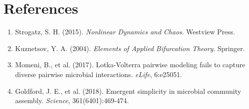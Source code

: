 \documentclass[11pt]{article}
\begin{document}
\section*{References}

\small
\begin{enumerate}
    \item Strogatz, S. H. (2015). \textit{Nonlinear Dynamics and Chaos}. Westview Press.
    \item Kuznetsov, Y. A. (2004). \textit{Elements of Applied Bifurcation Theory}. Springer.
    \item Momeni, B., et al. (2017). Lotka-Volterra pairwise modeling fails to capture diverse pairwise microbial interactions. \textit{eLife}, 6:e25051.
    \item Goldford, J. E., et al. (2018). Emergent simplicity in microbial community assembly. \textit{Science}, 361(6401):469-474.
\end{enumerate}
\end{document}
